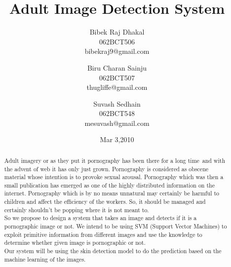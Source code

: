 \documentclass[a4paper,12pt]{report}
\begin{document}


\title{Adult Image Detection System}

\author{Bibek Raj Dhakal \\ 062BCT506 \\ bibekraj9@gmail.com \and Biru Charan Sainju \\ 062BCT507 \\thugliffe@gmail.com \and Suvash Sedhain\\ 062BCT548 \\mesuvash@gmail.com } 

\date{Mar 3,2010}
\maketitle
\begin{abstract}


Adult imagery or as they put it pornography has been there for a long time\ and with the advent of web it has only just grown. Pornography is considered as obscene material whose intention is to provoke sexual arousal. Pornography which was then a small publication has emerged as one of the highly distributed information on the internet. Pornography which is by no means unnatural may certainly be harmful to children and affect the efficiency of the workers. So, it should be managed and certainly shouldn't  be popping where it is not meant to. \\[0.5cm]

So we propose to design a system that takes an image and detects if it is a pornographic image or not. We intend to be using SVM (Support Vector Machines) to exploit primitive information from different images and use the knowledge to determine whether given image is pornographic or not.
\\[0.5cm]

Our system will be using the skin detection model to do the prediction based on the machine learning of the images.


\end{abstract}

\listoftables 
\listoffigures


\end{document}
